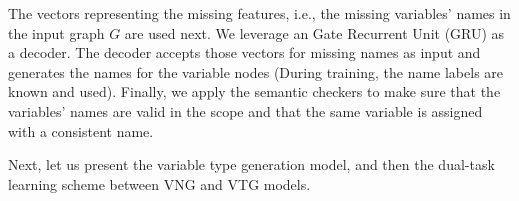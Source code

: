 The vectors representing the missing features, i.e., the missing
variables' names in the input graph $G$ are used next.  We leverage an
Gate Recurrent Unit (GRU) as a decoder.
The decoder accepts those vectors for missing names as input and
generates the names for the variable nodes (During training, the name
labels are known and used). Finally, we apply the semantic checkers to
make sure that the variables' names are valid in the scope and that
the same variable is assigned with a consistent name.



Next, let us present the variable type generation model, and then
the dual-task learning scheme between VNG and VTG models.









